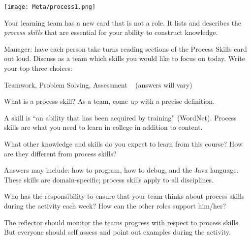 
\begin{minipage}{0.45\textwidth}

\texttt{[image: Meta/process1.png]}

\end{minipage}
\hfill
\begin{minipage}{0.5\textwidth}

Your learning team has a new card that is not a role.
It lists and describes the \emph{process skills} that are essential for your ability to construct knowledge.

\end{minipage}




\Q Manager: have each person take turns reading sections of the Process Skills card out loud.
Discuss as a team which skills you would like to focus on today.
Write your top three choices:

\begin{answer}
Teamwork, Problem Solving, Assessment ~ (answers will vary)
\end{answer}


\Q What is a process skill?
As a team, come up with a precise definition.

\begin{answer}[5em]
A skill is ``an ability that has been acquired by training'' (WordNet).
Process skills are what you need to learn in college in addition to content.
\end{answer}


\Q What other knowledge and skills do you expect to learn from this course?
How are they different from process skills?

\begin{answer}[5em]
Answers may include: how to program, how to debug, and the Java language.
These skills are domain-specific; process skills apply to all disciplines.
\end{answer}


\Q Who has the responsibility to ensure that your team thinks about process skills during the activity each week?
How can the other roles support him/her?

\begin{answer}
The reflector should monitor the teams progress with respect to process skills.
But everyone should self assess and point out examples during the activity.
\end{answer}
